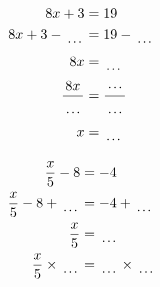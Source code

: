 \documentclass[12pt]{article}
\newcounter{minipagecount}
\begin{document}
\begin{multicols}{2}
\begin{minipage}[t]{0.45\textwidth}
    \raggedright %
    \begin{align*} %
        8x + 3 &= 19\\
        8x + 3 - \dotuline{\hspace{5mm}} &= 19 - \dotuline{\hspace{5mm}}\\
        8x &= \dotuline{\hspace{5mm}}\\
        \frac{8x}{\dotuline{\hspace{5mm}}} &= \frac{\dotuline{\hspace{5mm}}}{\dotuline{\hspace{5mm}}}\\
        x &= \dotuline{\hspace{5mm}}\\
    \end{align*}
\end{minipage}\columnbreak
\noindent{(\theminipagecount)}\hspace{0.1mm} %
\begin{minipage}[t]{0.45\textwidth} %
    \vspace{-26pt}  %
    \raggedright %
    \begin{align*} %
        \frac{x}{5} - 8 &= -4\\
        \frac{x}{5} - 8 + \dotuline{\hspace{5mm}} &= -4 + \dotuline{\hspace{5mm}}\\
        \frac{x}{5} &= \dotuline{\hspace{5mm}}\\
        \frac{x}{5} \times\dotuline{\hspace{5mm}} &= \dotuline{\hspace{5mm}} \times\dotuline{\hspace{5mm}}\\

\end{align*}
\end{minipage}
\end{multicols}
\end{document}
